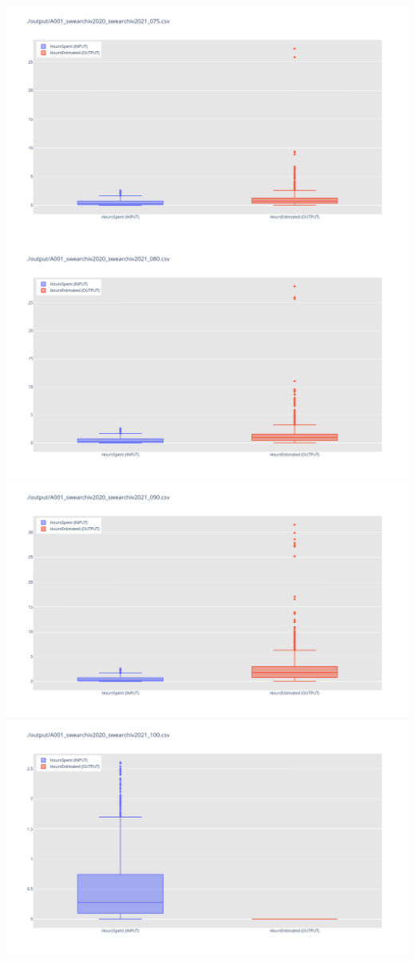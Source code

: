 \includegraphics[width=\textwidth]{Scripts/output/A001_swearchiv2020_swearchiv2021_075.csv.png}
\includegraphics[width=\textwidth]{Scripts/output/A001_swearchiv2020_swearchiv2021_080.csv.png}
\includegraphics[width=\textwidth]{Scripts/output/A001_swearchiv2020_swearchiv2021_090.csv.png}
\includegraphics[width=\textwidth]{Scripts/output/A001_swearchiv2020_swearchiv2021_100.csv.png}
